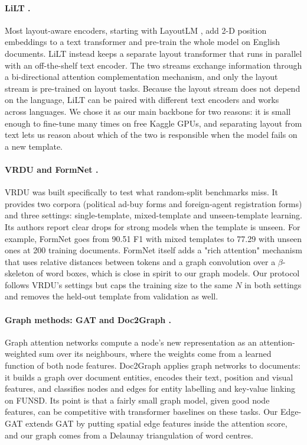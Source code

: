\documentclass[11pt,a4paper]{article}
\begin{document}
\paragraph{LiLT \cite{lilt}.} Most layout-aware encoders, starting with LayoutLM \cite{layoutlm}, add 2-D position embeddings to a text transformer and pre-train the whole model on English documents. LiLT instead keeps a separate layout transformer that runs in parallel with an off-the-shelf text encoder. The two streams exchange information through a bi-directional attention complementation mechanism, and only the layout stream is pre-trained on layout tasks. Because the layout stream does not depend on the language, LiLT can be paired with different text encoders and works across languages. We chose it as our main backbone for two reasons: it is small enough to fine-tune many times on free Kaggle GPUs, and separating layout from text lets us reason about which of the two is responsible when the model fails on a new template.

\paragraph{VRDU and FormNet \cite{vrdu,formnet}.} VRDU was built specifically to test what random-split benchmarks miss. It provides two corpora (political ad-buy forms and foreign-agent registration forms) and three settings: single-template, mixed-template and unseen-template learning. Its authors report clear drops for strong models when the template is unseen. For example, FormNet goes from 90.51 F1 with mixed templates to 77.29 with unseen ones at 200 training documents. FormNet itself adds a "rich attention" mechanism that uses relative distances between tokens and a graph convolution over a $\beta$-skeleton of word boxes, which is close in spirit to our graph models. Our protocol follows VRDU's settings but caps the training size to the same $N$ in both settings and removes the held-out template from validation as well.

\paragraph{Graph methods: GAT and Doc2Graph \cite{gat,doc2graph}.} Graph attention networks compute a node's new representation as an attention-weighted sum over its neighbours, where the weights come from a learned function of both node features. Doc2Graph applies graph networks to documents: it builds a graph over document entities, encodes their text, position and visual features, and classifies nodes and edges for entity labelling and key-value linking on FUNSD. Its point is that a fairly small graph model, given good node features, can be competitive with transformer baselines on these tasks. Our Edge-GAT extends GAT by putting spatial edge features inside the attention score, and our graph comes from a Delaunay triangulation of word centres.
\end{document}
